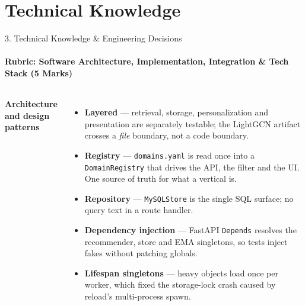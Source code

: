 \documentclass[aspectratio=169, 11pt]{beamer}
\newcommand{\eqs}{%
  \setlength{\abovedisplayskip}{3pt}%
  \setlength{\belowdisplayskip}{3pt}%
  \setlength{\abovedisplayshortskip}{2pt}%
  \setlength{\belowdisplayshortskip}{2pt}}
\newcommand{\blk}[1]{{\scriptsize\eqs\textbf{#1}}\par\vspace{0.9mm}}
\newenvironment{tight}{\begin{itemize}\scriptsize\setlength{\itemsep}{3.2pt}}{\end{itemize}}
\begin{document}
\section{Technical Knowledge}

\begin{frame}[shrink]{3. Technical Knowledge \& Engineering Decisions}
\framesubtitle{Rubric: Software Architecture, Implementation, Integration \& Tech Stack (5 Marks)}
\vspace{1mm}
\begin{columns}[T]
\blk{Architecture and design patterns}
\begin{tight}
  \item \textbf{Layered} --- retrieval, storage, personalization and presentation are separately
        testable; the LightGCN artifact crosses a \emph{file} boundary, not a code boundary.
  \item \textbf{Registry} --- \texttt{domains.yaml} is read once into a \texttt{DomainRegistry}
        that drives the API, the filter and the UI. One source of truth for what a vertical is.
  \item \textbf{Repository} --- \texttt{MySQLStore} is the single SQL surface; no query text in a
        route handler.
  \item \textbf{Dependency injection} --- FastAPI \texttt{Depends} resolves the recommender, store
        and EMA singletons, so tests inject fakes without patching globals.
  \item \textbf{Lifespan singletons} --- heavy objects load once per worker, which fixed the
        storage-lock crash caused by reload's multi-process spawn.
\end{tight}


\end{columns}
\end{frame}
\end{document}
